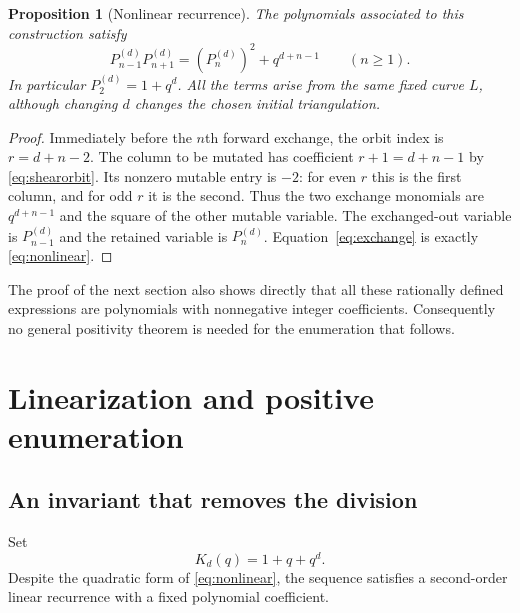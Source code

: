 \documentclass[11pt,letterpaper]{article}
\numberwithin{equation}{section}
\newtheorem{proposition}[theorem]{Proposition}
\theoremstyle{definition}
\begin{document}
\begin{proposition}[Nonlinear recurrence]\label{prop:nonlinear}
The polynomials associated to this construction satisfy
\begin{equation}\label{eq:nonlinear}
 P_{n-1}^{(d)}P_{n+1}^{(d)}
   =(P_n^{(d)})^2+q^{d+n-1}\qquad(n\geq1).
\end{equation}
In particular $P_2^{(d)}=1+q^d$. All the terms arise from the same fixed curve
$L$, although changing $d$ changes the chosen initial triangulation.
\end{proposition}
\begin{proof}
Immediately before the $n$th forward exchange, the orbit index is
$r=d+n-2$. The column to be mutated has coefficient $r+1=d+n-1$ by
\eqref{eq:shearorbit}. Its nonzero mutable entry is $-2$: for even $r$ this is
the first column, and for odd $r$ it is the second. Thus the two exchange
monomials are $q^{d+n-1}$ and the square of the other mutable variable.
The exchanged-out variable is $P_{n-1}^{(d)}$ and the retained variable is
$P_n^{(d)}$. Equation~\eqref{eq:exchange} is exactly \eqref{eq:nonlinear}.
\end{proof}

The proof of the next section also shows directly that all these rationally
defined expressions are polynomials with nonnegative integer coefficients.
Consequently no general positivity theorem is needed for the enumeration
that follows.

\section{Linearization and positive enumeration}\label{sec:enumeration}

\subsection{An invariant that removes the division}

Set
\begin{equation}\label{eq:Kd}
 K_d(q)=1+q+q^d.
\end{equation}
Despite the quadratic form of \eqref{eq:nonlinear}, the sequence satisfies a
second-order linear recurrence with a fixed polynomial coefficient.
\end{document}
